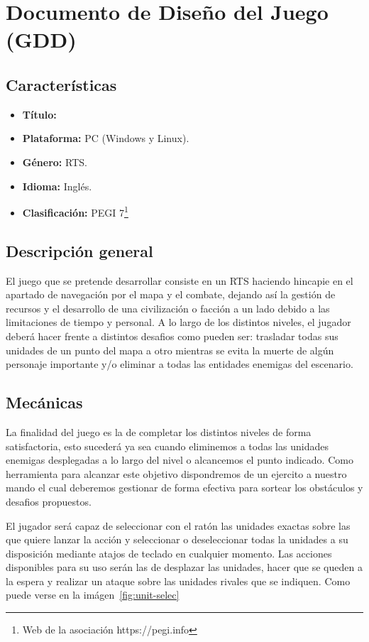 \chapter{Documento de Diseño del Juego (GDD)}
\label{GDD}
\section{Características}
\begin{itemize}
	\item \textbf{Título:} 
	\item \textbf{Plataforma:} \ac{PC} (Windows y Linux).
	\item \textbf{Género:} \acf{RTS}.
	\item \textbf{Idioma:} Inglés.
	\item \textbf{Clasificación:} PEGI 7\footnote{Web de la asociación https://pegi.info}
\end{itemize}

\section{Descripción general}
El juego que se pretende desarrollar consiste en un \ac{RTS} haciendo hincapie en el
apartado de navegación por el mapa y el combate, dejando así la gestión de recursos
y el desarrollo de una civilización o facción a un lado debido a las limitaciones
de tiempo y personal. A lo largo de los distintos niveles, el jugador deberá hacer
frente a distintos desafios como pueden ser: trasladar todas sus unidades de un punto
del mapa a otro mientras se evita la muerte de algún personaje importante y/o eliminar
a todas las entidades enemigas del escenario.

\section{Mecánicas}
La finalidad del juego es la de completar los distintos niveles de forma satisfactoria,
esto sucederá ya sea cuando eliminemos a todas las unidades enemigas desplegadas a lo
largo del nivel o alcancemos el punto indicado. Como herramienta para alcanzar este
objetivo dispondremos de un ejercito a nuestro mando el cual deberemos gestionar de
forma efectiva para sortear los obstáculos y desafios propuestos.

El jugador será capaz de seleccionar con el ratón las unidades exactas sobre las que
quiere lanzar la acción y seleccionar o deseleccionar todas la unidades a su
disposición mediante atajos de teclado en cualquier momento. Las acciones disponibles
para su uso serán las de desplazar las unidades, hacer que se queden a la espera y
realizar un ataque sobre las unidades rivales que se indiquen. Como puede verse en la
imágen~\ref{fig:unit-selec}

